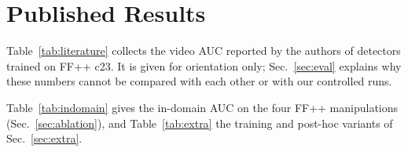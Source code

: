 \documentclass[fonts]{icst}
\begin{document}
\onecolumn
\appendix
\renewcommand{\thesection}{A}\renewcommand{\thetable}{A\arabic{table}}\setcounter{table}{0}
\section{Published Results}
\label{sec:appendix}
Table~\ref{tab:literature} collects the video AUC reported by the authors of detectors trained on FF++ c23. It is given for orientation only; Sec.~\ref{sec:eval} explains why these numbers cannot be compared with each other or with our controlled runs.

\begin{table}[!h]
\centering
\caption{Published video AUC of detectors trained on FF++ c23, as reported by their authors (mostly Table~1 of Effort~\cite{yan2025effort}). Selection rules, frames and seeds differ between rows; the numbers are listed for reference only and are not comparable with Tables~\ref{tab:main}--\ref{tab:perdataM}. $^\dagger$: values reported by Effort.}
\label{tab:literature}
\resizebox{\textwidth}{!}{}
\end{table}

Table~\ref{tab:indomain} gives the in-domain AUC on the four FF++ manipulations (Sec.~\ref{sec:ablation}), and Table~\ref{tab:extra} the training and post-hoc variants of Sec.~\ref{sec:extra}.

\begin{table}[!h]
\centering
\caption{In-domain video AUC ($\times100$) on the four FF++ manipulations (test split), seed means.}
\label{tab:indomain}
\footnotesize
\end{table}
\end{document}
